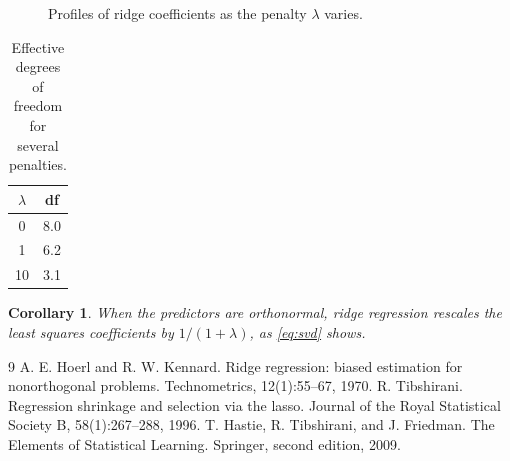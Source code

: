 \documentclass[11pt]{article}
\newtheorem{corollary}[theorem]{Corollary}
\theoremstyle{definition}
\begin{document}
\begin{figure}[h]
\centering
\fbox{\rule{0pt}{1.1in}\hspace{3in}}
\caption{Profiles of ridge coefficients as the penalty $\lambda$ varies.}
\label{fig:path}
\end{figure}

\begin{table}[h]
\centering
\caption{Effective degrees of freedom for several penalties.}
\label{tab:df}
\begin{tabular}{cc}
$\lambda$ & df \\ \hline
0 & 8.0 \\
1 & 6.2 \\
10 & 3.1
\end{tabular}
\end{table}

\begin{corollary}
When the predictors are orthonormal, ridge regression rescales the least squares coefficients by $1/(1+\lambda)$, as \eqref{eq:svd} shows.
\end{corollary}

\begin{thebibliography}{9}
 A. E. Hoerl and R. W. Kennard. Ridge regression: biased estimation for nonorthogonal problems. Technometrics, 12(1):55--67, 1970.
 R. Tibshirani. Regression shrinkage and selection via the lasso. Journal of the Royal Statistical Society B, 58(1):267--288, 1996.
 T. Hastie, R. Tibshirani, and J. Friedman. The Elements of Statistical Learning. Springer, second edition, 2009.
\end{thebibliography}
\end{document}
